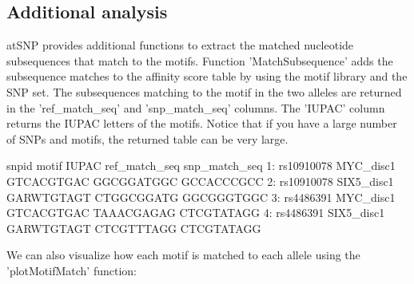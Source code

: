 \documentclass[a4paper,10pt]{article}
\begin{document}
\subsection{Additional analysis}

atSNP provides additional functions to extract the matched nucleotide subsequences that match to the motifs. Function 'MatchSubsequence' adds the subsequence matches to the affinity score table by using the motif library and the SNP set. The subsequences matching to the motif in the two alleles are returned in the 'ref\_match\_seq' and 'snp\_match\_seq' columns. The 'IUPAC' column returns the IUPAC letters of the motifs. Notice that if you have a large number of SNPs and motifs, the returned table can be very large.

\begin{Schunk}
\begin{Soutput}
        snpid      motif      IUPAC ref_match_seq snp_match_seq
1: rs10910078  MYC_disc1 GTCACGTGAC    GGCGGATGGC    GCCACCCGCC
2: rs10910078 SIX5_disc1 GARWTGTAGT    CTGGCGGATG    GGCGGGTGGC
3:  rs4486391  MYC_disc1 GTCACGTGAC    TAAACGAGAG    CTCGTATAGG
4:  rs4486391 SIX5_disc1 GARWTGTAGT    CTCGTTTAGG    CTCGTATAGG
\end{Soutput}
\end{Schunk}

We can also visualize how each motif is matched to each allele using the 'plotMotifMatch' function:
\end{document}
